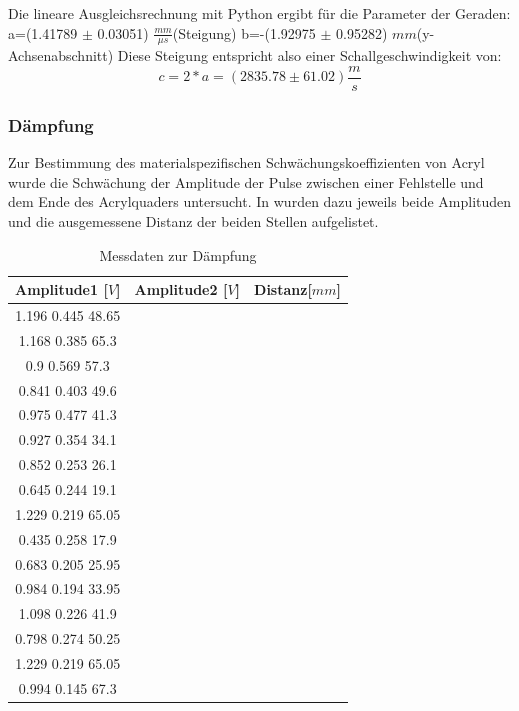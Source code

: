 Die lineare Ausgleichsrechnung mit Python ergibt für die Parameter der Geraden:\newline
a=(1.41789 $\pm$ 0.03051) $\frac{mm}{\mu s}$(Steigung)\newline
b=-(1.92975 $\pm$ 0.95282) $mm$(y-Achsenabschnitt)\newline
Diese Steigung entspricht also einer Schallgeschwindigkeit von:
\begin{equation*}
  c=2*a= (2835.78 \pm 61.02) \frac{m}{s}
\end{equation*} 
\subsubsection{Dämpfung}
Zur Bestimmung des materialspezifischen Schwächungskoeffizienten von Acryl wurde die Schwächung der Amplitude der Pulse zwischen einer Fehlstelle und dem Ende des Acrylquaders untersucht. In wurden dazu jeweils beide Amplituden und die ausgemessene Distanz der beiden Stellen aufgelistet.
\begin{table}
  \centering
  \caption{Messdaten zur Dämpfung}
\label{tab:messd}
  \begin{tabular}{c c c}
  \toprule
  Amplitude1 [$V$] & Amplitude2 [$V$] & Distanz[$mm$]\\
  \midrule
1.196 0.445 48.65\\
1.168 0.385 65.3\\
0.9 0.569 57.3\\
0.841 0.403 49.6\\
0.975 0.477 41.3\\
0.927 0.354 34.1\\
0.852 0.253 26.1\\
0.645 0.244 19.1\\
1.229 0.219 65.05\\
0.435 0.258 17.9\\
0.683 0.205 25.95\\
0.984 0.194 33.95\\
1.098 0.226 41.9\\
0.798 0.274 50.25\\
1.229 0.219 65.05\\
0.994 0.145 67.3\\
  \bottomrule
  \end{tabular}
\end{table}

